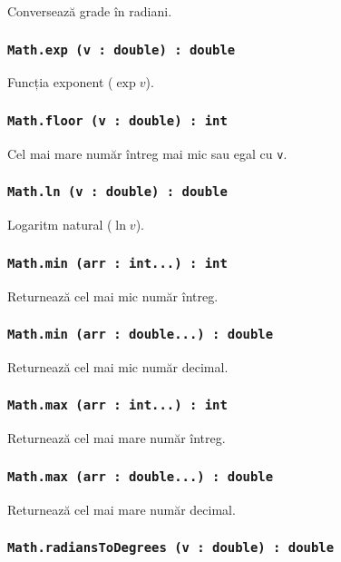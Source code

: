 Conversează grade în radiani.

\subsubsection{\texttt{Math.exp (v : double) : double}}

Funcția exponent ($\exp{v}$).

\subsubsection{\texttt{Math.floor (v : double) : int}}

Cel mai mare număr întreg mai mic sau egal cu \texttt{v}.

\subsubsection{\texttt{Math.ln (v : double) : double}}

Logaritm natural ($\ln{v}$).

\subsubsection{\texttt{Math.min (arr : int...) : int}}

Returnează cel mai mic număr întreg.

\subsubsection{\texttt{Math.min (arr : double...) : double}}

Returnează cel mai mic număr decimal.

\subsubsection{\texttt{Math.max (arr : int...) : int}}

Returnează cel mai mare număr întreg.

\subsubsection{\texttt{Math.max (arr : double...) : double}}

Returnează cel mai mare număr decimal.

\subsubsection{\texttt{Math.radiansToDegrees (v : double) : double}}

